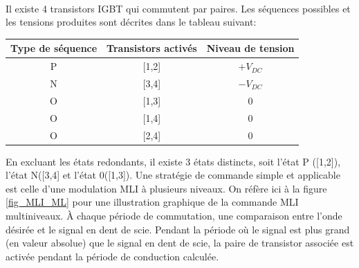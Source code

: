 \documentclass[11pt,letterpaper,final]{report}
\begin{document}
\paragraph{}Il existe 4 transistors IGBT qui commutent par paires. Les séquences possibles et les tensions produites sont décrites dans le tableau suivant:

\begin{table}[htb]
\centering
\begin{tabular}{ |c|c|c| }
\hline
  Type de séquence & Transistors activés & Niveau de tension \\\hline\hline
  P & [1,2] & $+V_{DC}$ \\\hline
  N & [3,4] & $-V_{DC}$ \\\hline
  O & [1,3] & $0$ \\\hline
  O & [1,4] & $0$ \\\hline
  O & [2,4] & $0$ \\\hline
\end{tabular}
\end{table}

En excluant les états redondants, il existe 3 états distincts, soit l'état P ([1,2]), l'état N([3,4] et l'état 0([1,3]). Une stratégie de commande simple et applicable est celle d'une modulation MLI à plusieurs niveaux. On réfère ici à la figure \ref{fig_MLI_ML} pour une illustration graphique de la commande MLI multiniveaux. À chaque période de commutation, une comparaison entre l'onde désirée et le signal en dent de scie. Pendant la période où le signal est plus grand (en valeur absolue) que le signal en dent de scie, la paire de transistor associée est activée pendant la période de conduction calculée. 
\end{document}
